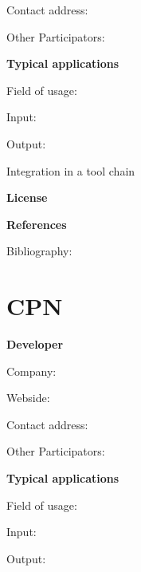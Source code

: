 \documentclass{./template/openetcs_report}
\begin{document}
	Contact address:

	Other  Participators:



	\textbf{Typical applications}

	Field of usage:


	Input:

	Output:





	Integration in a tool chain



	\textbf{License}


	\textbf{References}

	Bibliography:


\section{CPN}

	\textbf{Developer}

	Company: 

	Webside:

	Contact address:

	Other  Participators:



	\textbf{Typical applications}

	Field of usage:


	Input:

	Output:



\end{document}
